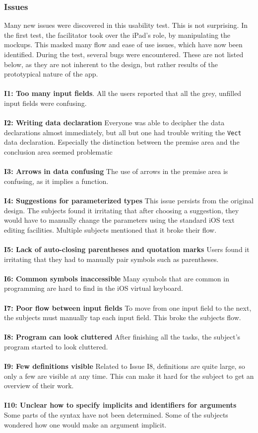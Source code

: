 \subsubsection{Issues}
\label{sec:second_issues}
Many new issues were discovered in this usability test. This is not
surprising. In the first test, the facilitator took over the iPad's role, by
manipulating the mockups. This masked many flow and ease of use issues, which
have now been identified. During the test, several bugs were encountered. These
are not listed below, as they are not inherent to the design, but rather
results of the prototypical nature of the app.
\\ \\
\textbf{I1: Too many input fields}.
All the users reported that all the grey, unfilled input fields were confusing.
\\ \\
\textbf{I2: Writing data declaration}
Everyone was able to decipher the data declarations almost immediately, but
all but one had trouble writing the \texttt{Vect} data declaration. Especially
the distinction between the premise area and the conclusion area seemed
problematic
\\ \\
\textbf{I3: Arrows in data confusing}
The use of arrows in the premise area is confusing, as it implies a function.
\\ \\
\textbf{I4: Suggestions for parameterized types}
This issue persists from the original design. The subjects found it irritating
that after choosing a suggestion, they would have to manually change the
parameters using the standard iOS text editing facilities. Multiple subjects
mentioned that it broke their flow.
\\ \\
\textbf{I5: Lack of auto-closing parentheses and quotation marks}
Users found it irritating that they had to manually pair symbols such as
parentheses.
\\ \\
\textbf{I6: Common symbols inaccessible}
Many symbols that are common in programming are hard to find in the iOS virtual
keyboard.
\\ \\
\textbf{I7: Poor flow between input fields}
To move from one input field to the next, the subjects must manually tap each
input field. This broke the subjects flow.
\\ \\
\textbf{I8: Program can look cluttered}
After finishing all the tasks, the subject's program started to look cluttered.
\\ \\
\textbf{I9: Few definitions visible}
Related to Issue I8, definitions are quite large, so only a few are visible at
any time. This can make it hard for the subject to get an overview of their
work.
\\ \\
\textbf{I10: Unclear how to specify implicits and identifiers for arguments}
Some parts of the syntax have not been determined. Some of the subjects
wondered how one would make an argument implicit.


